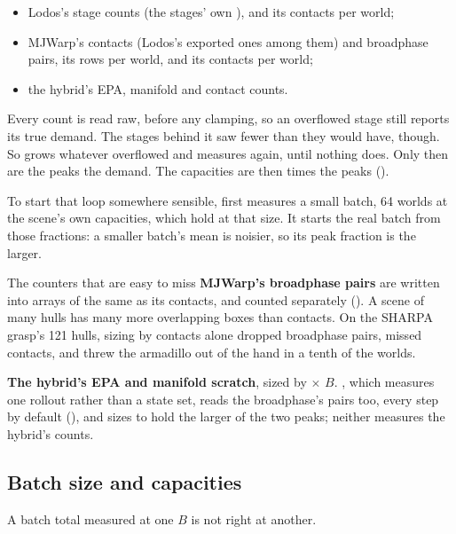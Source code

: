 \begin{itemize}
\item Lodos's stage counts (the stages' own ), and its contacts per world;
\item MJWarp's contacts (Lodos's exported ones among them) and broadphase pairs, its rows per world, and its contacts per world;
\item the hybrid's EPA, manifold and contact counts.
\end{itemize}

Every count is read raw, before any clamping, so an overflowed stage still reports its true demand. The stages behind it saw fewer than they would have, though. So  grows whatever overflowed and measures again, until nothing does. Only then are the peaks the demand. The capacities are then  times the peaks ().

To start that loop somewhere sensible,  first measures a small batch, 64 worlds at the scene's own capacities, which hold at that size. It starts the real batch from those fractions: a smaller batch's mean is noisier, so its peak fraction is the larger.

\begin{notebox}{The counters that are easy to miss}
\textbf{MJWarp's broadphase pairs} are written into arrays of the same  as its contacts, and counted separately (). A scene of many hulls has many more overlapping boxes than contacts. On the SHARPA grasp's 121 hulls, sizing  by contacts alone dropped broadphase pairs, missed contacts, and threw the armadillo out of the hand in a tenth of the worlds.

\textbf{The hybrid's EPA and manifold scratch}, sized by  $\times$ $B$. , which measures one rollout rather than a state set, reads the broadphase's pairs too, every step by default (), and  sizes  to hold the larger of the two peaks; neither measures the hybrid's counts.
\end{notebox}

\subsection{Batch size and capacities}\label{sec:capB}

A batch total measured at one $B$ is not right at another.

